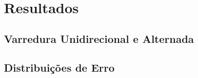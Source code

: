 \section{Resultados}

\subsection{Varredura Unidirecional e Alternada}
    {}

\subsection{Distribuições de Erro}
    

